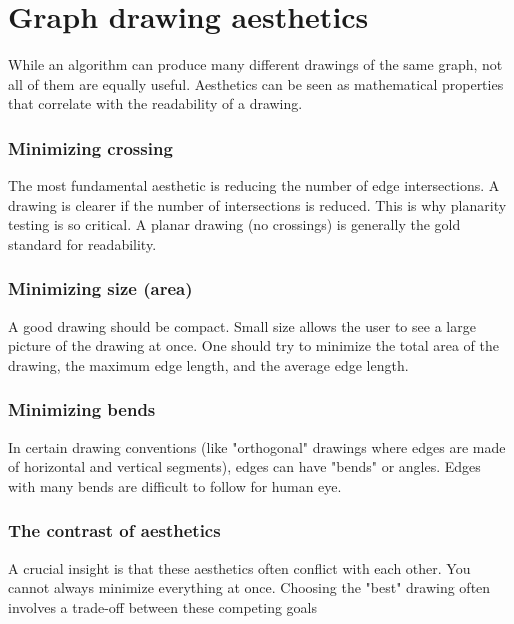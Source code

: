 \section{Graph drawing aesthetics}
While an algorithm can produce many different drawings of the same graph, not all of them are equally useful. Aesthetics can be seen as mathematical properties that correlate with the readability of a drawing.

\subsubsection{Minimizing crossing}
The most fundamental aesthetic is reducing the number of edge intersections. A drawing is clearer if the number of intersections is reduced. This is why planarity testing is so critical. A planar drawing (no crossings) is generally the gold standard for readability.

\subsubsection{Minimizing size (area)}
A good drawing should be compact. Small size allows the user to see a large picture of the drawing at once. One should try to minimize the total area of the drawing, the maximum edge length, and the average edge length.

\subsubsection{Minimizing bends}
In certain drawing conventions (like "orthogonal" drawings where edges are made of horizontal and vertical segments), edges can have "bends" or angles. Edges with many bends are difficult to follow for human eye.

\subsubsection{The contrast of aesthetics}
A crucial insight is that these aesthetics often conflict with each other. You cannot always minimize everything at once. Choosing the "best" drawing often involves a trade-off between these competing goals

